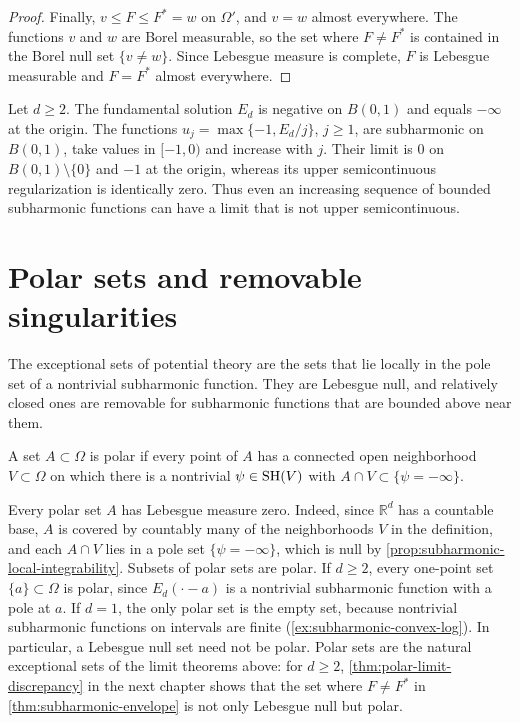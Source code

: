 \begin{proof}
Finally, $v\leq F\leq F^*=w$ on $\Omega'$, and $v=w$ almost everywhere. The functions $v$ and $w$ are Borel measurable, so the set where $F\neq F^*$ is contained in the Borel null set $\{v\neq w\}$. Since Lebesgue measure is complete, $F$ is Lebesgue measurable and $F=F^*$ almost everywhere.
\end{proof}

\begin{example}\label{ex:envelope-pointwise-gap}
Let $d\geq2$. The fundamental solution $E_d$ is negative on $B(0,1)$ and equals $-\infty$ at the origin. The functions $u_j=\max\{-1,E_d/j\}$, $j\geq1$, are subharmonic on $B(0,1)$, take values in $[-1,0)$ and increase with $j$. Their limit is $0$ on $B(0,1)\setminus\{0\}$ and $-1$ at the origin, whereas its upper semicontinuous regularization is identically zero. Thus even an increasing sequence of bounded subharmonic functions can have a limit that is not upper semicontinuous.
\end{example}

\section{Polar sets and removable singularities}
\label{sec:polar-removability}
The exceptional sets of potential theory are the sets that lie locally in the pole set of a nontrivial subharmonic function. They are Lebesgue null, and relatively closed ones are removable for subharmonic functions that are bounded above near them.

\begin{definition}\label{def:polar-set}
A set $A\subset\Omega$ is polar if every point of $A$ has a connected open neighborhood $V\subset\Omega$ on which there is a nontrivial $\psi\in\mathrm{SH}(V)$ with $A\cap V\subset\{\psi=-\infty\}$.
\end{definition}
Every polar set $A$ has Lebesgue measure zero. Indeed, since $\mathbb R^d$ has a countable base, $A$ is covered by countably many of the neighborhoods $V$ in the definition, and each $A\cap V$ lies in a pole set $\{\psi=-\infty\}$, which is null by \cref{prop:subharmonic-local-integrability}. Subsets of polar sets are polar. If $d\geq2$, every one-point set $\{a\}\subset\Omega$ is polar, since $E_d(\cdot-a)$ is a nontrivial subharmonic function with a pole at $a$. If $d=1$, the only polar set is the empty set, because nontrivial subharmonic functions on intervals are finite (\cref{ex:subharmonic-convex-log}). In particular, a Lebesgue null set need not be polar. Polar sets are the natural exceptional sets of the limit theorems above: for $d\geq2$, \cref{thm:polar-limit-discrepancy} in the next chapter shows that the set where $F\neq F^*$ in \cref{thm:subharmonic-envelope} is not only Lebesgue null but polar.

